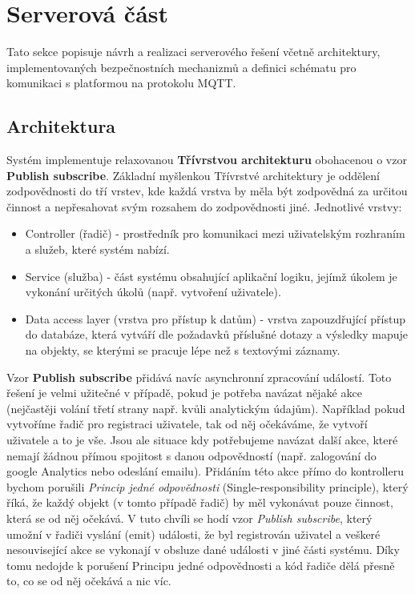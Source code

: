 
\section{Serverová část}
Tato sekce popisuje návrh a realizaci serverového řešení včetně architektury, implementovaných bezpečnostních mechanizmů a definici schématu pro komunikaci s platformou na protokolu MQTT.


\subsection{Architektura}
Systém implementuje relaxovanou \textbf{Třívrstvou architekturu} obohacenou o vzor \textbf{Publish subscribe}. Základní myšlenkou Třívrstvé architektury je oddělení zodpovědnosti do tří vrstev, kde každá vrstva by měla být zodpovědná za určitou činnost a nepřesahovat svým rozsahem do zodpovědnosti jiné. Jednotlivé vrstvy:
\begin{itemize}
    \item Controller (řadič) - prostředník pro komunikaci mezi uživatelským rozhraním a služeb, které systém nabízí.
    \item Service (služba) - část systému obsahující aplikační logiku, jejímž úkolem je vykonání určitých úkolů (např. vytvoření uživatele).
    \item Data access layer (vrstva pro přístup k datům) - vrstva zapouzdřující přístup do databáze, která vytváří dle požadavků příslušné dotazy a výsledky mapuje na objekty, se kterými se pracuje lépe než s textovými záznamy.
\end{itemize}

Vzor \textbf{Publish subscribe} přidává navíc asynchronní zpracování událostí. Toto řešení je velmi užitečné v případě, pokud je potřeba navázat nějaké akce (nejčastěji volání třetí strany např. kvůli analytickým údajům). Například pokud vytvoříme řadič pro registraci uživatele, tak od něj očekáváme, že vytvoří uživatele a to je vše. Jsou ale situace kdy potřebujeme navázat další akce, které nemají žádnou přímou spojitost s danou odpovědností (např. zalogování do google Analytics nebo odeslání emailu). Přidáním této akce přímo do kontrolleru bychom porušili \textit{Princip jedné odpovědnosti} (Single-responsibility principle), který říká, že každý objekt (v tomto případě řadič) by měl vykonávat pouze činnost, která se od něj očekává. V tuto chvíli se hodí vzor \textit{Publish subscribe}, který umožní v řadiči vyslání (emit) události, že byl registrován uživatel a veškeré nesouvisející akce se vykonají v obsluze dané události v jiné části systému. Díky tomu nedojde k porušení Principu jedné odpovědnosti a kód řadiče dělá přesně to, co se od něj očekává a nic víc.

